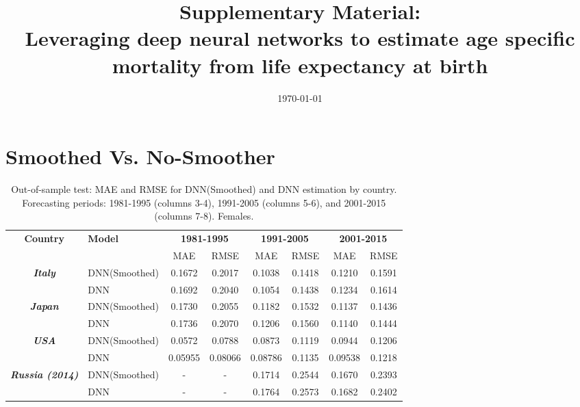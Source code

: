 \documentclass[a4,11pt]{article}
\title{\textbf{Supplementary Material:}\\

 Leveraging deep neural networks to estimate age specific mortality from life expectancy at birth}
\author{}
\date{\today}
\begin{document}
	\maketitle


\section{Smoothed Vs. No-Smoother}

\begin{table}[H]
		\centering
		\caption{Out-of-sample test: MAE and RMSE for DNN(Smoothed) and DNN estimation by country. Forecasting periods: 1981-1995 (columns 3-4), 1991-2005 (columns 5-6), and 2001-2015 (columns 7-8). Females.}
		\label{tab:1}
			\footnotesize	
		\begin{tabular}{cl|cc|cc|cc}
			\hline 		
			\multirow{2}{*}{\textbf{Country}} & \multirow{2}{*}{\textbf{Model}} & \multicolumn{2}{c|}{\textbf{1981-1995}} & \multicolumn{2}{c}{\textbf{1991-2005}} & \multicolumn{2}{c}{\textbf{2001-2015}}\tabularnewline
			\cline{3-8} 
			&  &  MAE & RMSE & MAE & RMSE &  MAE & RMSE\tabularnewline
			\hline 
\multirow{2}{*}{\textbf{\textit{Italy}}} & \multirow{1}{*}{DNN(Smoothed)}  &  0.1672& 0.2017    &    0.1038& 0.1418 &    0.1210& 0.1591 \tabularnewline
			                                 & \multirow{1}{*}{DNN}                   &   0.1692& 0.2040   &   0.1054 & 0.1438&      0.1234& 0.1614 \tabularnewline
                        \hline 
\multirow{2}{*}{\textbf{\textit{Japan}}} & \multirow{1}{*}{DNN(Smoothed)}  &0.1730& 0.2055    &     0.1182& 0.1532  &   0.1137&0.1436\tabularnewline
				                           & \multirow{1}{*}{DNN}                    & 0.1736 & 0.2070   &   0.1206 & 0.1560     &   0.1140&0.1444\tabularnewline
                     \hline 
\multirow{2}{*}{\textbf{\textit{USA}}} &\multirow{1}{*}{DNN(Smoothed)}  &0.0572&0.0788     &0.0873& 0.1119       &   0.0944& 0.1206 \tabularnewline
					                 &\multirow{1}{*}{DNN}                   & 0.05955 & 0.08066   & 0.08786 & 0.1135       &   0.09538& 0.1218 \tabularnewline
                     \hline 
\multirow{2}{*}{\textbf{\textit{Russia (2014)}}} &\multirow{1}{*}{DNN(Smoothed)}  &-&-&     0.1714&0.2544 &     0.1670& 0.2393 \tabularnewline
				                                       &\multirow{1}{*}{DNN}                   &-&-&    0.1764& 0.2573    &0.1682& 0.2402 \tabularnewline
  	   		\hline 
		\end{tabular}
	\end{table}
%
\end{document}
